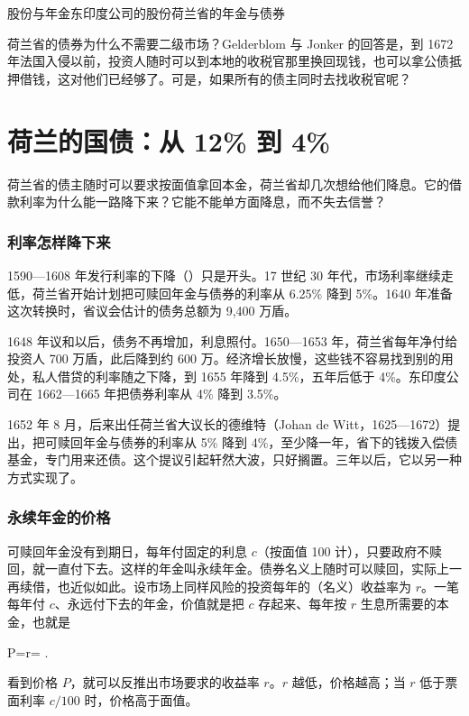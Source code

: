 \begin{compare}{股份与年金}{东印度公司的股份}{荷兰省的年金与债券}
\end{compare}

荷兰省的债券为什么不需要二级市场？Gelderblom 与 Jonker 的回答是，到 1672 年法国入侵以前，投资人随时可以到本地的收税官那里换回现钱，也可以拿公债抵押借钱，这对他们已经够了\cite{gj2011}。可是，如果所有的债主同时去找收税官呢？

\section{荷兰的国债：从 12\% 到 4\%}\label{sec:finrev-holland}

荷兰省的债主随时可以要求按面值拿回本金，荷兰省却几次想给他们降息。它的借款利率为什么能一路降下来？它能不能单方面降息，而不失去信誉？

\subsubsection{利率怎样降下来}
1590—1608 年发行利率的下降（）只是开头。17 世纪 30 年代，市场利率继续走低，荷兰省开始计划把可赎回年金与债券的利率从 6.25\% 降到 5\%。1640 年准备这次转换时，省议会估计的债务总额为 9,400 万盾\cite{gj2011}。

1648 年议和以后，债务不再增加，利息照付。1650—1653 年，荷兰省每年净付给投资人 700 万盾，此后降到约 600 万。经济增长放慢，这些钱不容易找到别的用处，私人借贷的利率随之下降，到 1655 年降到 4.5\%，五年后低于 4\%。东印度公司在 1662—1665 年把债券利率从 4\% 降到 3.5\%\cite{gj2011}。

1652 年 8 月，后来出任荷兰省大议长的德维特（Johan de Witt，1625—1672）提出，把可赎回年金与债券的利率从 5\% 降到 4\%，至少降一年，省下的钱拨入偿债基金，专门用来还债。这个提议引起轩然大波，只好搁置\cite{gj2011}。三年以后，它以另一种方式实现了。

\subsubsection{永续年金的价格}
可赎回年金没有到期日，每年付固定的利息 $c$（按面值 100 计），只要政府不赎回，就一直付下去。这样的年金叫永续年金。债券名义上随时可以赎回，实际上一再续借，也近似如此。设市场上同样风险的投资每年的（名义）收益率为 $r$。一笔每年付 $c$、永远付下去的年金，价值就是把 $c$ 存起来、每年按 $r$ 生息所需要的本金，也就是
\begin{keyeq}
P=\qquad\Longleftrightarrow\qquad r= .\label{eq:finrev-perp}
\end{keyeq}
看到价格 $P$，就可以反推出市场要求的收益率 $r$。$r$ 越低，价格越高；当 $r$ 低于票面利率 $c/100$ 时，价格高于面值。

